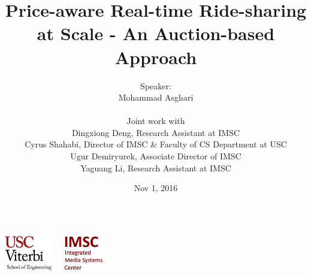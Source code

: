 \documentclass[t]{beamer}
\begin{document}
\graphicspath{ {Graphics/}{Graphics/old/} }

\title[USC Viterbi School of Engineering]{Price-aware Real-time Ride-sharing at Scale - An Auction-based Approach}  
\author[Mohammad Asghari]{\small{Speaker:}\\Mohammad Asghari\\
\vspace{0.05in}
\begin{flushleft}
\tiny{
\hspace{1.25in}Joint work with\\
\hspace{1.25in}Dingxiong Deng, Research Assistant at IMSC\\
\hspace{1.25in}Cyrus Shahabi, Director of IMSC \& Faculty of CS Department at USC}\\
\hspace{1.25in}Ugur Demiryurek, Associate Director of IMSC\\
\hspace{1.25in}Yaguang Li, Research Assistant at IMSC
\vspace{-0.25in}
\end{flushleft}}

\date{Nov 1, 2016} 
\begin{frame}
\titlepage
\vspace{-0.5in}
\begin{columns}
  \begin{center}
    \includegraphics[height=1.5cm]{viterbi_logo.jpg}
  \end{center}
  \begin{center}
    \includegraphics[height=1.5cm]{imsc_logo.jpg}   
  \end{center}
\end{columns} 
\end{frame}
\end{document}
